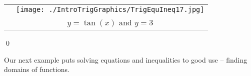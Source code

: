\begin{ex}
\begin{enumerate}
\begin{center}
\begin{tabular}{m{2in}c}
& 

\hspace{1.25in} \texttt{[image: ./IntroTrigGraphics/TrigEquIneq17.jpg]} \\

& \hspace{1.25in} $y = \tan(x)$ and \boldmath $y =3$ \\

\end{tabular}

\end{center}


\vspace{-.25in} \qed

\end{enumerate}


\end{ex}


Our next example puts solving equations and inequalities to good use -- finding domains of functions.


